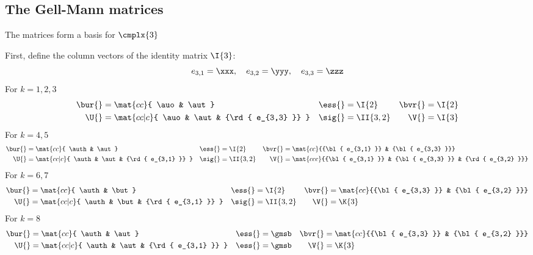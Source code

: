 \subsection{The Gell-Mann matrices}
The matrices form a basis for $\cmplx{3}$

First, define the column vectors of the identity matrix $\I{3}$:
%
\begin{equation}
  e_{3,1} = \xxx, \quad e_{3,2} = \yyy, \quad e_{3,3} = \zzz
\end{equation}
%
For $k=1,2,3$
\begin{align} 
\bur{}& = \mat{cc}{ \auo & \aut }&                     \ess{}& = \I{2}&  \bvr{}& = \I{2} \\ 
\U{}& = \mat{cc|c}{ \auo & \aut & {\rd{ e_{3,3} }} }&  \sig{}& = \II{3,2}& \V{}& = \I{3}
\end{align}
%
For $k=4,5$
\begin{align} 
\bur{}& = \mat{cc}{ \auth & \aut }& \ess{}& = \I{2}&  \bvr{}& = \mat{cc}{{\bl{ e_{3,1} }} & {\bl{ e_{3,3} }}} \\ 
\U{}& = \mat{cc|c}{ \auth & \aut & {\rd{ e_{3,1} }} }&  \sig{}& = \II{3,2}& \V{}& = \mat{ccc}{{\bl{ e_{3,1} }} & {\bl{ e_{3,3} }} & {\rd{ e_{3,2} }}}
\end{align}
%
For $k=6,7$
\begin{align} 
\bur{}& = \mat{cc}{ \auth & \but }& \ess{}& = \I{2}&  \bvr{}& = \mat{cc}{{\bl{ e_{3,3} }} & {\bl{ e_{3,2} }}} \\ 
\U{}& = \mat{cc|c}{ \auth & \but & {\rd{ e_{3,1} }} }&  \sig{}& = \II{3,2}& \V{}& = \K{3}
\end{align}
%
For $k=8$
\begin{align} 
\bur{}& = \mat{cc}{ \auth & \aut }& \ess{}& = \gmsb &  \bvr{}& = \mat{cc}{{\bl{ e_{3,3} }} & {\bl{ e_{3,2} }}} \\ 
\U{}& = \mat{cc|c}{ \auth & \aut & {\rd{ e_{3,1} }} }&  \ess{}& = \gmsb& \V{}& = \K{3}
\end{align}
%

